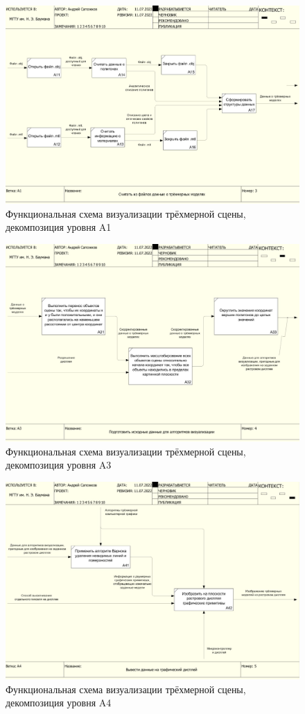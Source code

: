 \begin{figure}[h]
	\centering
	\includegraphics[width=\textwidth ]{img/IDEF0/A1_decomposition.jpg}
	\caption{Функциональная схема визуализации трёхмерной сцены, декомпозиция уровня A1}
\end{figure} 

\begin{figure}[h]
	\centering
	\includegraphics[width=\textwidth ]{img/IDEF0/A3_decomposition.jpg}
	\caption{Функциональная схема визуализации трёхмерной сцены, декомпозиция уровня A3}
\end{figure} 

\begin{figure}[h]
	\centering
	\includegraphics[width=\textwidth ]{img/IDEF0/A4_decomposition.jpg}
	\caption{Функциональная схема визуализации трёхмерной сцены, декомпозиция уровня A4}
\end{figure} 

